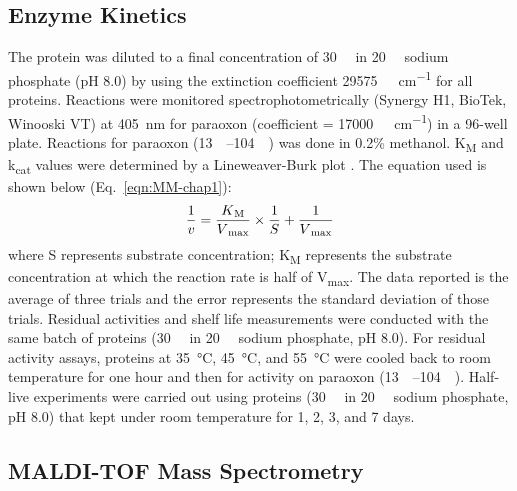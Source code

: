 \begin{refsection}
\subsection{Enzyme Kinetics}
\label{sec:kinetics-method}

The protein was diluted to a final concentration of \SI{30}{\nano\Molar} in
\SI{20}{\milli\Molar} sodium phosphate (pH 8.0) by using the extinction
coefficient \SI{29575}{\per\Molar\per\cm} for all proteins\cite{Gasteiger2005,
Pace1995}.  Reactions were monitored spectrophotometrically (Synergy H1,
BioTek, Winooski VT) at \SI{405}{\nm} for paraoxon (coefficient =
\SI{17000}{\per\Molar\per\cm}) \cite{Baker2011b} in a 96-well plate. Reactions for paraoxon
(\SIrange{13}{104}{\micro\Molar}) was done in 0.2\% methanol.
K\textsubscript{M} and k\textsubscript{cat} values were determined by a
Lineweaver-Burk plot \cite{Baker2011b}. The equation used is shown below
(Eq.~\ref{eqn:MM-chap1}): 
\begin{equation} 
    \frac{1}{v} =
    \frac{K\textsubscript{M}}{V\textsubscript{max}}\times\frac{1}{S} +
    \frac{1}{V\textsubscript{max}} 
    \label{eqn:MM-chap1}
\end{equation}
where S represents substrate concentration; K\textsubscript{M} represents the
substrate concentration at which the reaction rate is half of
V\textsubscript{max}. The data reported is the average of three trials and the
error represents the standard deviation of those trials. Residual activities
and shelf life measurements were conducted with the same batch of proteins
(\SI{30}{\nano\Molar} in \SI{20}{\milli\Molar} sodium phosphate, pH 8.0). For
residual activity assays, proteins at \SI{35}{\celsius}, \SI{45}{\celsius}, and
\SI{55}{\celsius} were cooled back to room temperature for one hour and then
for activity on paraoxon (\SIrange{13}{104}{\micro\Molar}). Half-live
experiments were carried out using proteins (\SI{30}{\nano\Molar} in
\SI{20}{\milli\Molar} sodium phosphate, pH 8.0) that kept under room
temperature for 1, 2, 3, and 7 days.  

\subsection{MALDI-TOF Mass Spectrometry}


\end{refsection}
